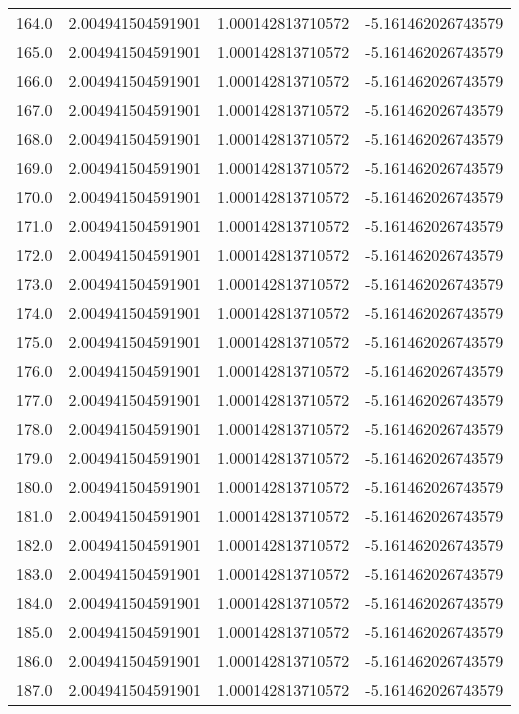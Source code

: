 \begin{longtable}{lrrr}
164.0 & 2.004941504591901 & 1.000142813710572 & -5.161462026743579 \\
165.0 & 2.004941504591901 & 1.000142813710572 & -5.161462026743579 \\
166.0 & 2.004941504591901 & 1.000142813710572 & -5.161462026743579 \\
167.0 & 2.004941504591901 & 1.000142813710572 & -5.161462026743579 \\
168.0 & 2.004941504591901 & 1.000142813710572 & -5.161462026743579 \\
169.0 & 2.004941504591901 & 1.000142813710572 & -5.161462026743579 \\
170.0 & 2.004941504591901 & 1.000142813710572 & -5.161462026743579 \\
171.0 & 2.004941504591901 & 1.000142813710572 & -5.161462026743579 \\
172.0 & 2.004941504591901 & 1.000142813710572 & -5.161462026743579 \\
173.0 & 2.004941504591901 & 1.000142813710572 & -5.161462026743579 \\
174.0 & 2.004941504591901 & 1.000142813710572 & -5.161462026743579 \\
175.0 & 2.004941504591901 & 1.000142813710572 & -5.161462026743579 \\
176.0 & 2.004941504591901 & 1.000142813710572 & -5.161462026743579 \\
177.0 & 2.004941504591901 & 1.000142813710572 & -5.161462026743579 \\
178.0 & 2.004941504591901 & 1.000142813710572 & -5.161462026743579 \\
179.0 & 2.004941504591901 & 1.000142813710572 & -5.161462026743579 \\
180.0 & 2.004941504591901 & 1.000142813710572 & -5.161462026743579 \\
181.0 & 2.004941504591901 & 1.000142813710572 & -5.161462026743579 \\
182.0 & 2.004941504591901 & 1.000142813710572 & -5.161462026743579 \\
183.0 & 2.004941504591901 & 1.000142813710572 & -5.161462026743579 \\
184.0 & 2.004941504591901 & 1.000142813710572 & -5.161462026743579 \\
185.0 & 2.004941504591901 & 1.000142813710572 & -5.161462026743579 \\
186.0 & 2.004941504591901 & 1.000142813710572 & -5.161462026743579 \\
187.0 & 2.004941504591901 & 1.000142813710572 & -5.161462026743579 \\

\end{longtable}
